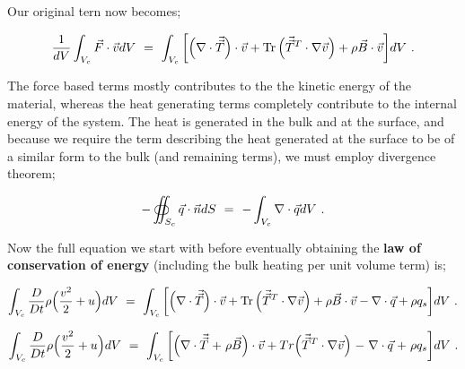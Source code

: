 \documentclass{article}
\DeclareMathOperator{\Tr}{Tr}
\begin{document}
Our original tern now becomes;

\begin{equation} \label{eb-eq-1-137}
\frac{1}{dV} \int_{V_c} \vec{F} \cdot \vec{v} dV \hspace{0.125cm} = \hspace{0.125cm} \int_{V_c} \bigg[ \Big( \nabla \cdot \vec{\vec{T}} \Big) \cdot \vec{v} + \Tr \Big( \vec{\vec{T}}^T \cdot \nabla{\vec{v}} \Big) + \rho \vec{B} \cdot \vec{v} \bigg]  dV \hspace{0.125cm}  . 
\end{equation}

The force based terms mostly contributes to the the kinetic energy of the material, whereas the heat generating terms completely contribute to the internal energy of the system. The heat is generated in the bulk and at the surface, and because we require the term describing the heat generated at the surface to be of a similar form to the bulk (and remaining terms), we must employ divergence theorem;

\begin{equation} \label{eb-eq-1-138}
- \oiint_{S_c} \vec{q} \cdot \vec{n} dS \hspace{0.125cm} = \hspace{0.125cm} - \int_{V_c} \nabla \cdot \vec{q} dV \hspace{0.125cm}  . 
\end{equation}

Now the full equation we start with before eventually obtaining the \textbf{law of conservation of energy} (including the bulk heating per unit volume term) is;

\begin{equation} \label{eb-eq-1-139}
\int_{V_c} \frac{D}{D t} \rho \Big( \frac{v^2}{2} + u \Big) dV \hspace{0.125cm} = \hspace{0.125cm} \int_{V_c} \bigg[ \Big( \nabla \cdot \vec{\vec{T}} \Big) \cdot \vec{v} + \Tr \Big( \vec{\vec{T}}^T \cdot \nabla{\vec{v}} \Big) + \rho \vec{B} \cdot \vec{v} - \nabla \cdot \vec{q} + \rho q_s \bigg] dV  \hspace{0.125cm}  . 
\end{equation}

\begin{equation} \label{eb-eq-1-140}
\int_{V_c} \frac{D}{D t} \rho \Big( \frac{v^2}{2} + u \Big) dV \hspace{0.125cm} = \hspace{0.125cm} \int_{V_c} \bigg[ \Big( \nabla \cdot \vec{\vec{T}} \hspace{0.025cm} + \hspace{0.025cm} \rho \vec{B} \Big) \cdot \vec{v}  + Tr \Big( \vec{\vec{T}}^T \cdot \nabla{\vec{v}} \Big) \hspace{0.025cm} - \hspace{0.025cm} \nabla \cdot \vec{q} \hspace{0.025cm} + \hspace{0.025cm} \rho q_s \bigg] dV  \hspace{0.125cm}  . 
\end{equation}
\end{document}
